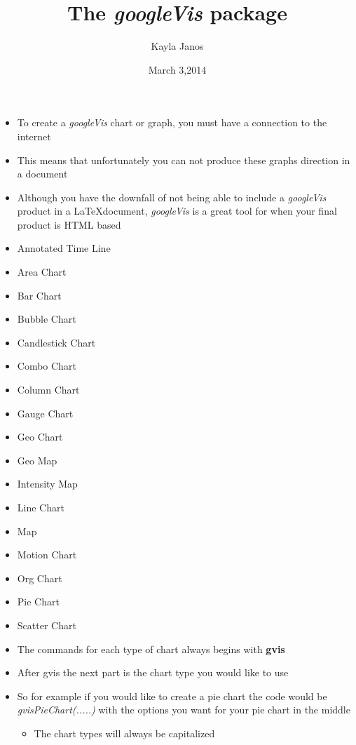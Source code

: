 \documentclass[Madrid]{beamer}\usepackage[]{graphicx}\usepackage[]{color}
\author{Kayla Janos}
\title{The \emph{googleVis} package}
\date{March 3,2014}
\begin{document}
\begin{frame}
\maketitle
\end{frame}

\begin{frame}
\begin{itemize}
\item{To create a \emph{googleVis} chart or graph, you must have a connection to the internet}
\item{This means that unfortunately you can not produce these graphs direction in a \latex document}
\item{Although you have the downfall of not being able to include a \emph{googleVis} product in a \LaTeX document, \emph{googleVis} is a great tool for when your final product is HTML based}
\end{itemize}
\end{frame}

\begin{frame}
\begin{itemize}
\item{Annotated Time Line}
\item{Area Chart}
\item{Bar Chart}
\item{Bubble Chart}
\item{Candlestick Chart}
\item{Combo Chart}
\item{Column Chart}
\item{Gauge Chart}
\item{Geo Chart}
\item{Geo Map}
\item{Intensity Map}
\item{Line Chart}
\item{Map}
\item{Motion Chart}
\item{Org Chart}
\item{Pie Chart}
\item{Scatter Chart}
\end{itemize}
\end{frame}

\begin{frame}
\begin{itemize}
\item{The commands for each type of chart always begins with \bf{gvis}}
\item{After gvis the next part is the chart type you would like to use}
\item{So for example if you would like to create a pie chart the code would be \emph{gvisPieChart(.....)} with the options you want for your pie chart in the middle}
\begin{itemize}
\item{The chart types will always be capitalized}
\end{itemize}
\end{itemize}
\end{frame}
\end{document}

